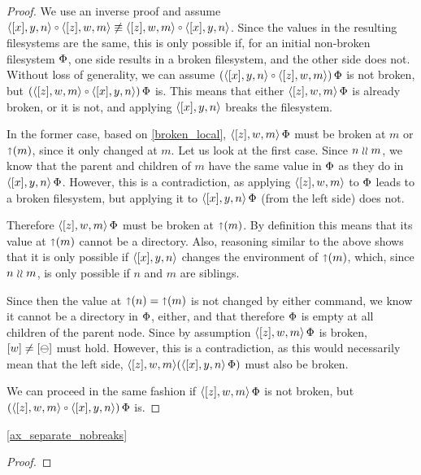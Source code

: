 \begin{proof}
We use an inverse proof and assume $\cxynv\cc\czwmv \nequiv \czwmv\cc\cxynv$.
Since the values in the resulting filesystems are the same,
this is only possible if, for an initial non-broken filesystem $\Phi$,
one side results in a broken filesystem, and the other side does not.
Without loss of generality, we can assume
$(\cxynv\cc\czwmv)\aFS$ is not broken, but $(\czwmv\cc\cxynv)\aFS$ is.
This means that either $\langle{[z],w,m}\rangle\,\Phi$ is already broken, or it is not, and applying $\langle{[x],y,n}\rangle$
breaks the filesystem.

In the former case, based on \cref{broken_local}, 
$\langle{[z],w,m}\rangle\,\Phi$ must be broken at $m$ or $\mathord{\shortuparrow}({m})$, since it only changed at $m$.
Let us look at the first case.
Since $n\mathrel{\wr\wr} m$, we know that the parent and children of $m$ have the same value
in $\Phi$ as they do in $\langle{[x],y,n}\rangle\,\Phi$. However, this is a contradiction,
as applying $\langle{[z],w,m}\rangle$ to $\Phi$ leads to a broken filesystem,
but applying it to $\langle{[x],y,n}\rangle\,\Phi$ (from the left side) does not.

Therefore $\langle{[z],w,m}\rangle\,\Phi$ must be broken at $\mathord{\shortuparrow}({m})$.
By definition this means that its value at $\mathord{\shortuparrow}({m})$ cannot be a directory.
Also, reasoning similar to the above shows that it is only possible if $\langle{[x],y,n}\rangle$ changes
the environment of $\mathord{\shortuparrow}({m})$, which, since $n\mathrel{\wr\wr} m$, is only possible
if $n$ and $m$ are siblings.

Since then the value at $\mathord{\shortuparrow}({n})=\mathord{\shortuparrow}({m})$ is not changed by either command,
we know it cannot be a directory in $\Phi$, either, and that therefore
$\Phi$ is empty at all children of the parent node.
Since by assumption $\langle{[z],w,m}\rangle\,\Phi$ is broken, $[w]\neq[\ominus]$ must hold.
However, this is a contradiction, as this would necessarily mean that
the left side, $\langle{[z],w,m}\rangle(\langle{[x],y,n}\rangle\,\Phi)$ must also be broken.

We can proceed in the same fashion if $\langle{[z],w,m}\rangle\,\Phi$ is not broken, but
$(\czwmv\cc\cxynv)\aFS$ is.
\end{proof}

\cref{ax_separate_nobreaks}

\begin{proof}
\end{proof}
